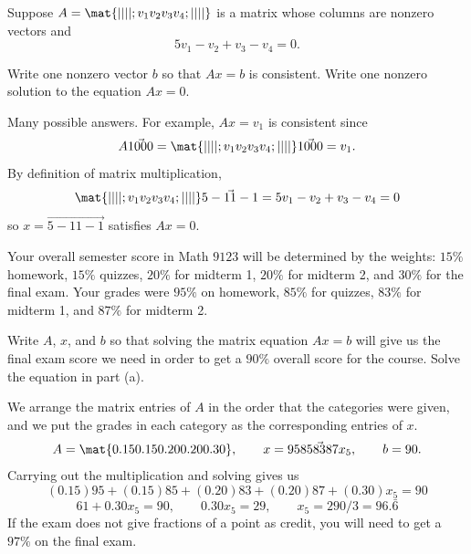 \begin{problems}
\problem Suppose $A = \mat{| | | |; v_1 v_2 v_3 v_4; | | | |}$ is a
matrix whose columns are nonzero vectors and
  \[5v_1 - v_2 + v_3 - v_4 = 0.\]
  \begin{subproblems}
	\subproblem Write one nonzero vector $b$ so that $Ax=b$ is
    consistent.  \subproblem Write one nonzero solution to the
    equation $Ax=0$.
	\end{subproblems}
    \begin{solution}
      \begin{subproblems}
        \subproblem Many possible answers.  For example, $Ax = v_1$ is
        consistent since
        \[A \vec{1 0 0 0} = \mat{| | | |; v_1 v_2 v_3 v_4; | | | |}
          \vec{1 0 0 0} = v_1.\] %
        \subproblem By definition of matrix multiplication,
        \[\mat{| | | |; v_1 v_2 v_3 v_4; | | | |}
          \vec{5 -1 1 -1} = 5v_1 - v_2 + v_3 - v_4 = 0\] so
        $x= \vec{5 -1 1 -1}$ satisfies $Ax=0$.
	\end{subproblems}
  \end{solution}


\problem %
%
Your overall semester score in Math $9123$ will be determined by
the weights: $15\%$ homework, $15\%$ quizzes, $20\%$ for midterm 1,
$20\%$ for midterm 2, and $30\%$ for the final exam.
\newline \newline
Your grades were $95\%$ on homework, $85\%$ for quizzes, $83\%$
for midterm 1, and $87\%$ for midterm 2.  
\begin{subproblems}
  \subproblem Write $A$, $x$, and $b$ so that solving the matrix
  equation $Ax = b$ will give us the final exam score we need in order
  to get a $90\%$ overall score for the course.  %
  \subproblem Solve the equation in part (a).
\end{subproblems}

\begin{solution}
  \begin{subproblems}
    \subproblem We arrange the matrix entries of $A$ in the order that
    the categories were given, and we put the grades in each category as
    the corresponding entries of $x$.
    \[A = \mat{0.15 0.15 0.20 0.20 0.30}, \qquad
      x = \vec{95 85 83 87 x_5}, \qquad b = 90.\]
    \subproblem Carrying out the multiplication and solving gives us
    \[(0.15)95 + (0.15)85 + (0.20)83 + (0.20)87 + (0.30)x_5 = 90\]
    \[61 + 0.30 x_5 = 90, \qquad 0.30 x_5 = 29, \qquad x_5 =
      290 / 3 = 96.\bar{6}\]
    If the exam does not give fractions of a point as credit, you will
    need to get a $97\%$ on the final exam.
  \end{subproblems}
\end{solution}


\end{problems}
